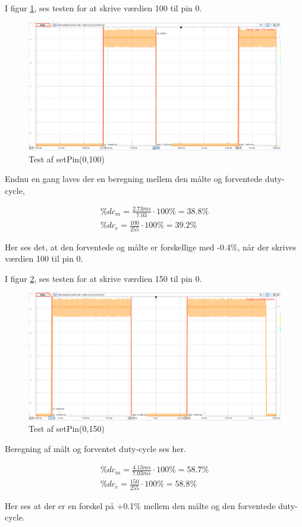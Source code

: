 \documentclass[Modultest/Modultest_main.tex]{subfiles}
\begin{document}
I figur \ref{fig:test_100_pin_0}, ses testen for at skrive værdien 100 til pin 0.
\begin{figure}[H]
    \centering
    \includegraphics[width=\textwidth]{Modultest/CupLight/graphics/pwm_100.png}
    \caption{Test af setPin(0,100)}
    \label{fig:test_100_pin_0}
\end{figure}
Endnu en gang laves der en beregning mellem den målte og forventede duty-cycle,
\begin{subequation}
\begin{align}
    \%dc_m=\frac{2.73ms}{7.03}\cdot 100\% = 38.8\%
    \\\%dc_e=\frac{100}{255}\cdot 100\% = 39.2\%
\end{align}
\end{subequation}
Her ses det, at den forventede og målte er forskellige med -0.4\%, når der skrives værdien 100 til pin 0.

I figur \ref{fig:test_150_pin_0}, ses testen for at skrive værdien 150 til pin 0.
\begin{figure}[H]
    \centering
    \includegraphics[width=\textwidth]{Modultest/CupLight/graphics/pwm_150.png}
    \caption{Test af setPin(0,150)}
    \label{fig:test_150_pin_0}
\end{figure}
Beregning af målt og forventet duty-cycle ses her.
\begin{subequation}
\begin{align}
    \%dc_m=\frac{4.13ms}{7.03ms}\cdot 100\% = 58.7\%
    \\\%dc_e=\frac{150}{255}\cdot 100\% = 58.8\%
\end{align}
\end{subequation}
Her ses at der er en forskel på +0.1\% mellem den målte og den forventede duty-cycle.
\end{document}
